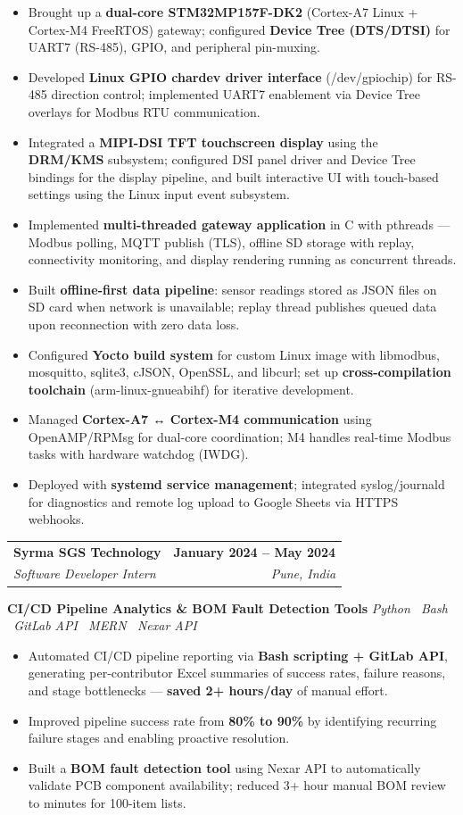 \documentclass[letterpaper,10.5pt]{article}
\makeatletter
\newcommand{\resumeItem}[1]{%
  \item\small{\color{darkgray}#1\vspace{-1pt}}}
\newcommand{\resumeSubheading}[4]{%
  \vspace{-2pt}\item
  \begin{tabular*}{1.0\textwidth}[t]{l@{\extracolsep{\fill}}r}
    \textbf{\color{navy}#1} & \textbf{\small\color{navy}#2}\\
    \textit{\small\color{medgray}#3} & \textit{\small\color{medgray}#4}\\
  \end{tabular*}\vspace{-6pt}}
\newcommand{\resumeItemListStart}{\begin{itemize}[leftmargin=0.18in,topsep=1pt]}
\newcommand{\resumeItemListEnd}{\end{itemize}\vspace{-3pt}}
\newcommand{\tech}[1]{\textit{\small\color{medgray}#1}}
\makeatother
\begin{document}
  \resumeItemListStart
    \resumeItem{Brought up a \textbf{dual-core STM32MP157F-DK2} (Cortex-A7 Linux + Cortex-M4 FreeRTOS) gateway; configured \textbf{Device Tree (DTS/DTSI)} for UART7 (RS-485), GPIO, and peripheral pin-muxing.}
    \resumeItem{Developed \textbf{Linux GPIO chardev driver interface} (/dev/gpiochip) for RS-485 direction control; implemented UART7 enablement via Device Tree overlays for Modbus RTU communication.}
    \resumeItem{Integrated a \textbf{MIPI-DSI TFT touchscreen display} using the \textbf{DRM/KMS} subsystem; configured DSI panel driver and Device Tree bindings for the display pipeline, and built interactive UI with touch-based settings using the Linux input event subsystem.}
    \resumeItem{Implemented \textbf{multi-threaded gateway application} in C with pthreads — Modbus polling, MQTT publish (TLS), offline SD storage with replay, connectivity monitoring, and display rendering running as concurrent threads.}
    \resumeItem{Built \textbf{offline-first data pipeline}: sensor readings stored as JSON files on SD card when network is unavailable; replay thread publishes queued data upon reconnection with zero data loss.}
    \resumeItem{Configured \textbf{Yocto build system} for custom Linux image with libmodbus, mosquitto, sqlite3, cJSON, OpenSSL, and libcurl; set up \textbf{cross-compilation toolchain} (arm-linux-gnueabihf) for iterative development.}
    \resumeItem{Managed \textbf{Cortex-A7 ↔ Cortex-M4 communication} using OpenAMP/RPMsg for dual-core coordination; M4 handles real-time Modbus tasks with hardware watchdog (IWDG).}
    \resumeItem{Deployed with \textbf{systemd service management}; integrated syslog/journald for diagnostics and remote log upload to Google Sheets via HTTPS webhooks.}
  \resumeItemListEnd

  \resumeSubheading
    {Syrma SGS Technology}{January 2024 -- May 2024}
    {Software Developer Intern}{Pune, India}

  \vspace{4pt}
  \textbf{\small\color{navy}CI/CD Pipeline Analytics \& BOM Fault Detection Tools}
  \hfill\tech{Python \textbullet\ Bash \textbullet\ GitLab API \textbullet\ MERN \textbullet\ Nexar API}

  \resumeItemListStart
    \resumeItem{Automated CI/CD pipeline reporting via \textbf{Bash scripting + GitLab API}, generating per-contributor Excel summaries of success rates, failure reasons, and stage bottlenecks — \textbf{saved 2+ hours/day} of manual effort.}
    \resumeItem{Improved pipeline success rate from \textbf{80\% to 90\%} by identifying recurring failure stages and enabling proactive resolution.}
    \resumeItem{Built a \textbf{BOM fault detection tool} using Nexar API to automatically validate PCB component availability; reduced 3+ hour manual BOM review to minutes for 100-item lists.}
  \resumeItemListEnd
\end{document}
